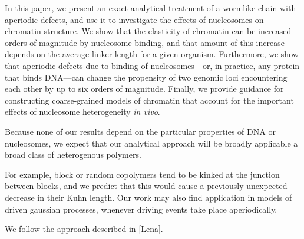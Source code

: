 \documentclass[%
 reprint,
superscriptaddress,
showpacs,preprintnumbers,
 amsmath,amssymb,
 aps,
 prl,
]{revtex4-1}
\begin{document}
In this paper, we present an exact analytical treatment of a wormlike chain
    with aperiodic defects, and use it to investigate the effects of nucleosomes
    on chromatin structure.
We show that the elasticity of chromatin can be increased orders of magnitude by
    nucleosome binding, and that amount of this increase depends on the average
    linker length for a given organism.
Furthermore, we show that aperiodic defects due to binding of nucleosomes---or, in
    practice, any protein that binds DNA---can change the
    propensity of two genomic loci encountering each other by up to six
    orders of magnitude.
Finally, we provide guidance for constructing coarse-grained models of chromatin
    that account for the important effects of nucleosome heterogeneity
    \textit{in vivo}.

Because none of our results depend on the particular properties of DNA or
    nucleosomes, we expect that our analytical approach will be broadly
    applicable a broad class of heterogenous polymers.

For example, block or random copolymers tend to be kinked at the junction
    between blocks, and we predict that this would cause a previously unexpected
    decrease in their Kuhn length.
Our work may also find application in models of driven gaussian processes,
    whenever driving events take place aperiodically.


We follow the approach described in [Lena].


\end{document}
